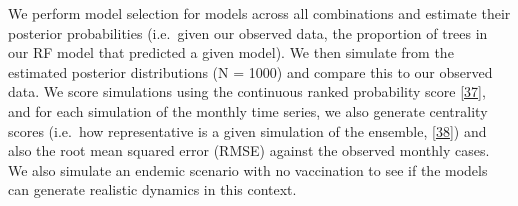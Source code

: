 \documentclass[
  oneside]{book}
\begin{document}
We perform model selection for models across all combinations and estimate their posterior probabilities (i.e.~given our observed data, the proportion of trees in our RF model that predicted a given model). We then simulate from the estimated posterior distributions (N = 1000) and compare this to our observed data. We score simulations using the continuous ranked probability score \protect\hyperlink{ref-jordan2019}{{[}37{]}}, and for each simulation of the monthly time series, we also generate centrality scores (i.e.~how representative is a given simulation of the ensemble, \protect\hyperlink{ref-juul2020}{{[}38{]}}) and also the root mean squared error (RMSE) against the observed monthly cases. We also simulate an endemic scenario with no vaccination to see if the models can generate realistic dynamics in this context.
\end{document}
